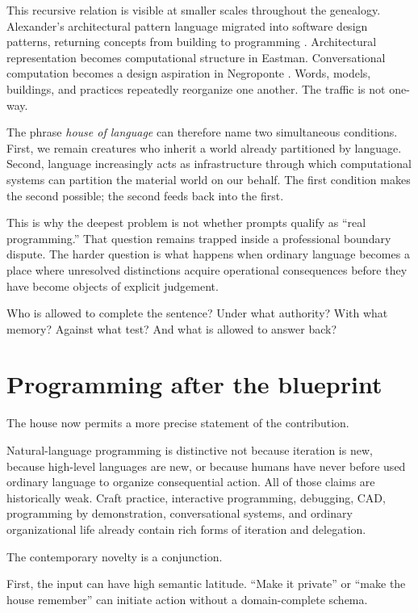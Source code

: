 \documentclass[11pt]{article}
\begin{document}
This recursive relation is visible at smaller scales throughout the genealogy. Alexander's architectural pattern language migrated into software design patterns, returning concepts from building to programming \citep{alexander1977pattern}. Architectural representation becomes computational structure in Eastman. Conversational computation becomes a design aspiration in Negroponte \citep{negroponte1970architecture}. Words, models, buildings, and practices repeatedly reorganize one another. The traffic is not one-way.

The phrase \emph{house of language} can therefore name two simultaneous conditions. First, we remain creatures who inherit a world already partitioned by language. Second, language increasingly acts as infrastructure through which computational systems can partition the material world on our behalf. The first condition makes the second possible; the second feeds back into the first.

This is why the deepest problem is not whether prompts qualify as ``real programming.'' That question remains trapped inside a professional boundary dispute. The harder question is what happens when ordinary language becomes a place where unresolved distinctions acquire operational consequences before they have become objects of explicit judgement.

Who is allowed to complete the sentence? Under what authority? With what memory? Against what test? And what is allowed to answer back?

\section{Programming after the blueprint}

The house now permits a more precise statement of the contribution.

Natural-language programming is distinctive not because iteration is new, because high-level languages are new, or because humans have never before used ordinary language to organize consequential action. All of those claims are historically weak. Craft practice, interactive programming, debugging, CAD, programming by demonstration, conversational systems, and ordinary organizational life already contain rich forms of iteration and delegation.

The contemporary novelty is a conjunction.

First, the input can have high semantic latitude. ``Make it private'' or ``make the house remember'' can initiate action without a domain-complete schema.
\end{document}
